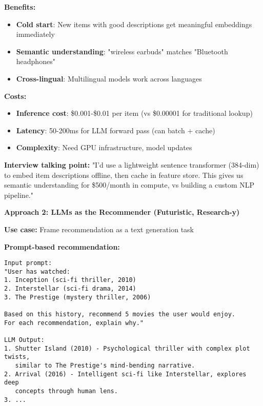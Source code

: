 \documentclass[10pt]{article}
\begin{document}
\textbf{Benefits:}
\begin{itemize}
\item \textbf{Cold start}: New items with good descriptions get meaningful embeddings immediately
\item \textbf{Semantic understanding}: "wireless earbuds" matches "Bluetooth headphones"
\item \textbf{Cross-lingual}: Multilingual models work across languages
\end{itemize}

\textbf{Costs:}
\begin{itemize}
\item \textbf{Inference cost}: \$0.001-\$0.01 per item (vs \$0.00001 for traditional lookup)
\item \textbf{Latency}: 50-200ms for LLM forward pass (can batch + cache)
\item \textbf{Complexity}: Need GPU infrastructure, model updates
\end{itemize}

\textbf{Interview talking point:} "I'd use a lightweight sentence transformer (384-dim) to embed item descriptions offline, then cache in feature store. This gives us semantic understanding for \$500/month in compute, vs building a custom NLP pipeline."

\textbf{Approach 2: LLMs as the Recommender (Futuristic, Research-y)}

\textbf{Use case:} Frame recommendation as a text generation task

\textbf{Prompt-based recommendation:}
\begin{verbatim}
Input prompt:
"User has watched:
1. Inception (sci-fi thriller, 2010)
2. Interstellar (sci-fi drama, 2014)
3. The Prestige (mystery thriller, 2006)

Based on this history, recommend 5 movies the user would enjoy.
For each recommendation, explain why."

LLM Output:
1. Shutter Island (2010) - Psychological thriller with complex plot twists,
   similar to The Prestige's mind-bending narrative.
2. Arrival (2016) - Intelligent sci-fi like Interstellar, explores deep
   concepts through human lens.
3. ...
\end{verbatim}
\end{document}
